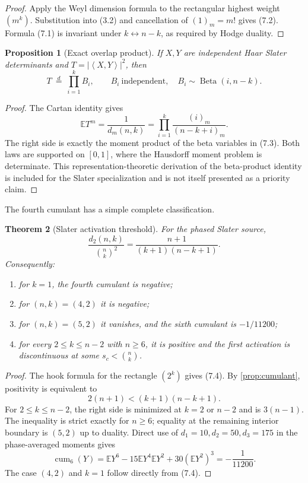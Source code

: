 \documentclass[11pt,a4paper]{article}
\newtheorem{theorem}{Theorem}[section]
\newtheorem{proposition}[theorem]{Proposition}
\newcommand{\E}{\mathbb E}
\newcommand{\ip}[2]{\left\langle #1,#2\right\rangle}
\DeclareMathOperator{\cum}{cum}
\begin{document}
\begin{proof}
Apply the Weyl dimension formula to the rectangular highest weight
$(m^k)$.  Substitution into (3.2) and cancellation of
$(1)_m=m!$ gives (7.2).  Formula (7.1) is invariant under
$k\leftrightarrow n-k$, as required by Hodge duality.
\end{proof}

\begin{proposition}[Exact overlap product]\label{prop:beta}
If $X,Y$ are independent Haar Slater determinants and
$T=|\ip{X}{Y}|^2$, then
\[
 T\ \overset d=\ \prod_{i=1}^k B_i,
 \qquad B_i\ \text{independent},\quad
 B_i\sim\operatorname{Beta}(i,n-k).
 \tag{7.3}
\]
\end{proposition}

\begin{proof}
The Cartan identity gives
\[
 \E T^m=\frac1{d_m(n,k)}
 =\prod_{i=1}^k\frac{(i)_m}{(n-k+i)_m}.
\]
The right side is exactly the moment product of the beta variables in
(7.3).  Both laws are supported on $[0,1]$, where the Hausdorff
moment problem is determinate.  This representation-theoretic derivation of
the beta-product identity is included for the Slater specialization and is
not itself presented as a priority claim.
\end{proof}

The fourth cumulant has a simple complete classification.

\begin{theorem}[Slater activation threshold]\label{thm:slaterphase}
For the phased Slater source,
\[
 \frac{d_2(n,k)}{\binom nk^2}
 =\frac{n+1}{(k+1)(n-k+1)}.
 \tag{7.4}
\]
Consequently:
\begin{enumerate}
\item for $k=1$, the fourth cumulant is negative;
\item for $(n,k)=(4,2)$ it is negative;
\item for $(n,k)=(5,2)$ it vanishes, and the sixth cumulant is
$-1/11200$;
\item for every $2\le k\le n-2$ with $n\ge6$, it is positive and the first
activation is discontinuous at some $s_c<\binom nk$.
\end{enumerate}
\end{theorem}

\begin{proof}
The hook formula for the rectangle $(2^k)$ gives (7.4).  By
\cref{prop:cumulant}, positivity is equivalent to
\[
 2(n+1)<(k+1)(n-k+1).
\]
For $2\le k\le n-2$, the right side is minimized at $k=2$ or $n-2$ and is
$3(n-1)$.  The inequality is strict exactly for $n\ge6$; equality at the
remaining interior boundary is $(5,2)$ up to duality.  Direct use of
$d_1=10,d_2=50,d_3=175$ in the phase-averaged moments gives
\[
 \cum_6(Y)=\E Y^6-15\E Y^4\E Y^2+30(\E Y^2)^3=-\frac1{11200}.
\]
The case $(4,2)$ and $k=1$ follow directly from (7.4).
\end{proof}
\end{document}
